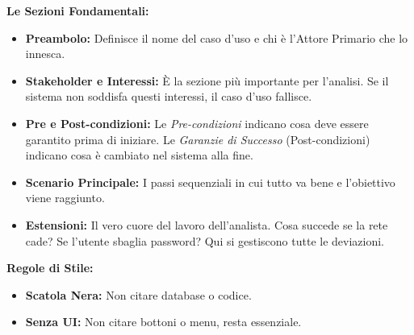 \documentclass[10pt, a4paper]{article}
\begin{document}
\noindent
\begin{minipage}[t]{0.48\textwidth}
    \vspace{0pt} %
    \textbf{Le Sezioni Fondamentali:}
    \begin{itemize}[leftmargin=*, label=$\triangleright$]
        \item \textbf{Preambolo:} Definisce il nome del caso d'uso e chi è l'Attore Primario che lo innesca.
        \item \textbf{Stakeholder e Interessi:} È la sezione più importante per l'analisi. Se il sistema non soddisfa questi interessi, il caso d'uso fallisce.
        \item \textbf{Pre e Post-condizioni:} Le \textit{Pre-condizioni} indicano cosa deve essere garantito prima di iniziare. Le \textit{Garanzie di Successo} (Post-condizioni) indicano cosa è cambiato nel sistema alla fine.
        \item \textbf{Scenario Principale:} I passi sequenziali in cui tutto va bene e l'obiettivo viene raggiunto.
        \item \textbf{Estensioni:} Il vero cuore del lavoro dell'analista. Cosa succede se la rete cade? Se l'utente sbaglia password? Qui si gestiscono tutte le deviazioni.
    \end{itemize}
    
    \vspace{0.3cm}
    \textbf{Regole di Stile:}
    \begin{itemize}[leftmargin=*]
        \item \textbf{Scatola Nera:} Non citare database o codice.
        \item \textbf{Senza UI:} Non citare bottoni o menu, resta essenziale.
    \end{itemize}
\end{minipage}%
\hfill%
\end{document}
